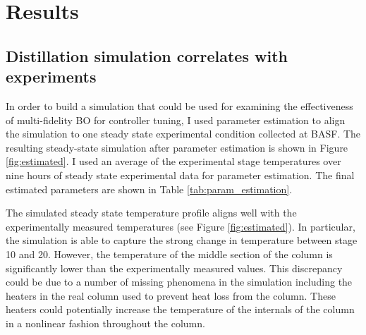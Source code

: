 
\section{Results}

\subsection{Distillation simulation correlates with experiments}

In order to build a simulation that could be used for examining the effectiveness of multi-fidelity BO for controller tuning, I used parameter estimation to align the simulation to one steady state experimental condition collected at BASF. The resulting steady-state simulation after parameter estimation is shown in Figure \ref{fig:estimated}. I used an average of the experimental stage temperatures over nine hours of steady state experimental data for parameter estimation. The final estimated parameters are shown in Table \ref{tab:param_estimation}.

The simulated steady state temperature profile aligns well with the experimentally measured temperatures (see Figure \ref{fig:estimated}). In particular, the simulation is able to capture the strong change in temperature between stage 10 and 20. However, the temperature of the middle section of the column is significantly lower than the experimentally measured values. This discrepancy could be due to a number of missing phenomena in the simulation including the heaters in the real column used to prevent heat loss from the column. These heaters could potentially increase the temperature of the internals of the column in a nonlinear fashion throughout the column. 

